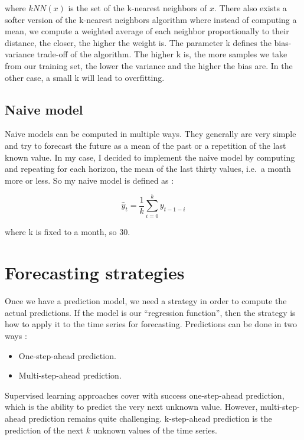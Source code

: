 \documentclass[11pt,a4paper,oneside]{book}
\newenvironment{myitemize}
{ \begin{itemize}
    \setlength\itemsep{0pt}}
{ \end{itemize}                  }
\begin{document}
where $kNN(x)$ is the set of the k-nearest neighbors of $x$. There also exists a softer version of the k-nearest neighbors algorithm where instead of computing a mean, we compute a weighted average of each neighbor proportionally to their distance, the closer, the higher the weight is. The parameter k defines the bias-variance trade-off of the algorithm. The higher k is, the more samples we take from our training set, the lower the variance and the higher the bias are. In the other case, a small k will lead to overfitting. \cite{navot}



\subsection{Naive model}

Naive models can be computed in multiple ways. They generally are very simple and try to forecast the future as a mean of the past or a repetition of the last known value. In my case, I decided to implement the naive model by computing and repeating for each horizon, the mean of the last thirty values, i.e.\ a month more or less. So my naive model is defined as : 

\begin{equation}
\hat{y}_t = \frac{1}{k} \sum_{i=0}^{k} y_{t-1-i}
\end{equation}

where k is fixed to a month, so 30.


\section{Forecasting strategies}\label{strat}

Once we have a prediction model, we need a strategy in order to compute the actual predictions. If the model is our ``regression function'', then the strategy is how to apply it to the time series for forecasting. Predictions can be done in two ways :

\begin{myitemize}
    \item One-step-ahead prediction.
    \item Multi-step-ahead prediction.
\end{myitemize}

Supervised learning approaches cover with success one-step-ahead prediction, which is the ability to predict the very next unknown value. However, multi-step-ahead prediction remains quite challenging.  k-step-ahead prediction is the prediction of the next $k$ unknown values of the time series. 
\end{document}
